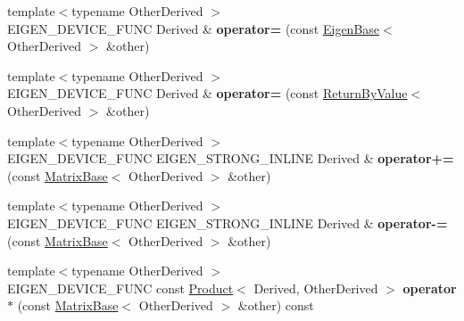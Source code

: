 \begin{DoxyCompactItemize}
\item 
\mbox{\label{class_eigen_1_1_matrix_base_a5d9916bdbdbe27244e17435fbdd68449}} 
{\footnotesize template$<$typename Other\+Derived $>$ }\\E\+I\+G\+E\+N\+\_\+\+D\+E\+V\+I\+C\+E\+\_\+\+F\+U\+NC Derived \& {\bfseries operator=} (const \mbox{\hyperlink{struct_eigen_1_1_eigen_base}{Eigen\+Base}}$<$ Other\+Derived $>$ \&other)
\item 
\mbox{\label{class_eigen_1_1_matrix_base_a53afc7cde5a75d9f931ca9e47a158509}} 
{\footnotesize template$<$typename Other\+Derived $>$ }\\E\+I\+G\+E\+N\+\_\+\+D\+E\+V\+I\+C\+E\+\_\+\+F\+U\+NC Derived \& {\bfseries operator=} (const \mbox{\hyperlink{class_eigen_1_1_return_by_value}{Return\+By\+Value}}$<$ Other\+Derived $>$ \&other)
\item 
\mbox{\label{class_eigen_1_1_matrix_base_a4929d849bed96aa908dea8d2c6e482a8}} 
{\footnotesize template$<$typename Other\+Derived $>$ }\\E\+I\+G\+E\+N\+\_\+\+D\+E\+V\+I\+C\+E\+\_\+\+F\+U\+NC E\+I\+G\+E\+N\+\_\+\+S\+T\+R\+O\+N\+G\+\_\+\+I\+N\+L\+I\+NE Derived \& {\bfseries operator+=} (const \mbox{\hyperlink{class_eigen_1_1_matrix_base}{Matrix\+Base}}$<$ Other\+Derived $>$ \&other)
\item 
\mbox{\label{class_eigen_1_1_matrix_base_a14153f407c04bedad9bd7c852bbbf83f}} 
{\footnotesize template$<$typename Other\+Derived $>$ }\\E\+I\+G\+E\+N\+\_\+\+D\+E\+V\+I\+C\+E\+\_\+\+F\+U\+NC E\+I\+G\+E\+N\+\_\+\+S\+T\+R\+O\+N\+G\+\_\+\+I\+N\+L\+I\+NE Derived \& {\bfseries operator-\/=} (const \mbox{\hyperlink{class_eigen_1_1_matrix_base}{Matrix\+Base}}$<$ Other\+Derived $>$ \&other)
\item 
\mbox{\label{class_eigen_1_1_matrix_base_a68eb8849f4f4771c2c1efb35f25bf89c}} 
{\footnotesize template$<$typename Other\+Derived $>$ }\\E\+I\+G\+E\+N\+\_\+\+D\+E\+V\+I\+C\+E\+\_\+\+F\+U\+NC const \mbox{\hyperlink{class_eigen_1_1_product}{Product}}$<$ Derived, Other\+Derived $>$ {\bfseries operator $\ast$} (const \mbox{\hyperlink{class_eigen_1_1_matrix_base}{Matrix\+Base}}$<$ Other\+Derived $>$ \&other) const

\end{DoxyCompactItemize}
